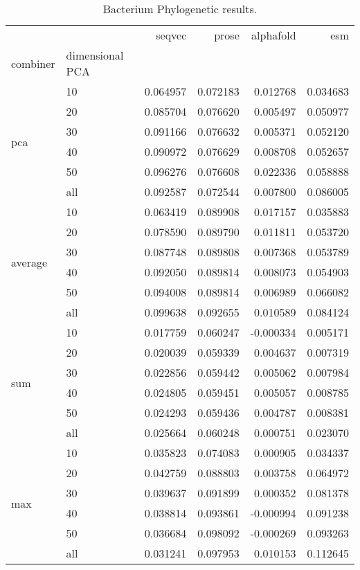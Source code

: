 \documentclass[12pt, letterpaper, twocolumn]{article}
\begin{document}
\begin{table*}[hbt]
    \begin{tabular}{llrrrr}
        \toprule
         &  & seqvec & prose & alphafold & esm \\
        combiner & dimensional PCA &  &  &  &  \\
        \midrule
        \multirow[t]{6}{*}{pca} & 10 & 0.064957 & 0.072183 & 0.012768 & 0.034683 \\
         & 20 & 0.085704 & 0.076620 & 0.005497 & 0.050977 \\
         & 30 & 0.091166 & 0.076632 & 0.005371 & 0.052120 \\
         & 40 & 0.090972 & 0.076629 & 0.008708 & 0.052657 \\
         & 50 & 0.096276 & 0.076608 & 0.022336 & 0.058888 \\
         & all & 0.092587 & 0.072544 & 0.007800 & 0.086005 \\
        \cline{1-6}
        \multirow[t]{6}{*}{average} & 10 & 0.063419 & 0.089908 & 0.017157 & 0.035883 \\
         & 20 & 0.078590 & 0.089790 & 0.011811 & 0.053720 \\
         & 30 & 0.087748 & 0.089808 & 0.007368 & 0.053789 \\
         & 40 & 0.092050 & 0.089814 & 0.008073 & 0.054903 \\
         & 50 & 0.094008 & 0.089814 & 0.006989 & 0.066082 \\
         & all & 0.099638 & 0.092655 & 0.010589 & 0.084124 \\
        \cline{1-6}
        \multirow[t]{6}{*}{sum} & 10 & 0.017759 & 0.060247 & -0.000334 & 0.005171 \\
         & 20 & 0.020039 & 0.059339 & 0.004637 & 0.007319 \\
         & 30 & 0.022856 & 0.059442 & 0.005062 & 0.007984 \\
         & 40 & 0.024805 & 0.059451 & 0.005057 & 0.008785 \\
         & 50 & 0.024293 & 0.059436 & 0.004787 & 0.008381 \\
         & all & 0.025664 & 0.060248 & 0.000751 & 0.023070 \\
        \cline{1-6}
        \multirow[t]{6}{*}{max} & 10 & 0.035823 & 0.074083 & 0.000905 & 0.034337 \\
         & 20 & 0.042759 & 0.088803 & 0.003758 & 0.064972 \\
         & 30 & 0.039637 & 0.091899 & 0.000352 & 0.081378 \\
         & 40 & 0.038814 & 0.093861 & -0.000994 & 0.091238 \\
         & 50 & 0.036684 & 0.098092 & -0.000269 & 0.093263 \\
         & all & 0.031241 & 0.097953 & 0.010153 & 0.112645 \\
        \cline{1-6}
        \bottomrule
        \end{tabular}        
\caption{Bacterium Phylogenetic results.}
\label{tab:bacterium_phylo_results}
\end{table*}
    
\end{document}
